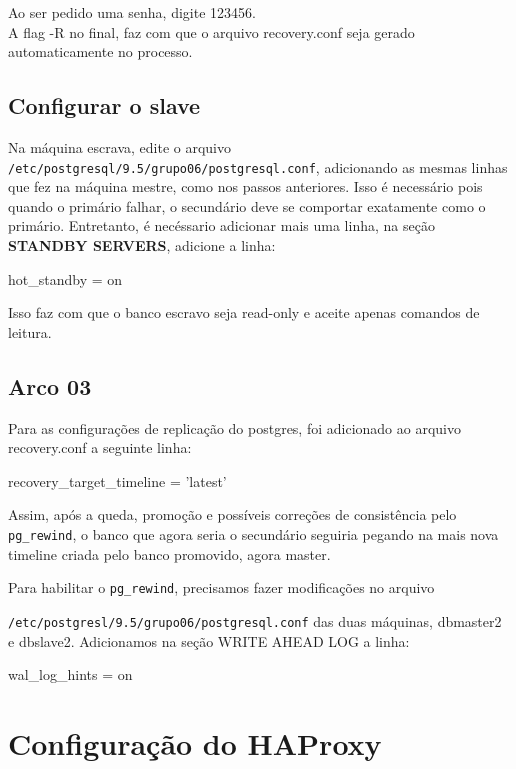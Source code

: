 \documentclass[a4paper,10pt]{article}
\begin{document}
        Ao ser pedido uma senha, digite 123456.\\
        A flag -R no final, faz com que o arquivo recovery.conf seja gerado automaticamente no processo.

    \subsection{Configurar o slave}
        Na máquina escrava, edite o arquivo \verb|/etc/postgresql/9.5/grupo06/postgresql.conf|, adicionando as mesmas linhas que fez na máquina mestre, como nos passos anteriores. Isso é necessário pois quando o primário falhar, o secundário deve se comportar exatamente como o primário. Entretanto, é necéssario adicionar mais uma linha, na seção \textbf{STANDBY SERVERS}, adicione a linha:
        \begin{spverbatim}
        hot_standby = on
        \end{spverbatim}

        Isso faz com que o banco escravo seja read-only e aceite apenas comandos de leitura.
        
    \subsection{Arco 03}
    
        Para as configurações de replicação do postgres, foi adicionado ao arquivo recovery.conf a seguinte linha:
        \begin{spverbatim}
        recovery_target_timeline = 'latest'
        \end{spverbatim}
    
        Assim, após a queda, promoção e possíveis correções de consistência pelo \verb|pg_rewind|, o banco que agora seria o secundário seguiria pegando na mais nova timeline criada pelo banco promovido, agora master.
    
    
    Para habilitar o \verb|pg_rewind|, precisamos fazer modificações no arquivo
    
    \verb|/etc/postgresl/9.5/grupo06/postgresql.conf| das duas máquinas, dbmaster2 e dbslave2. Adicionamos na seção WRITE AHEAD LOG a linha:
        
        \begin{spverbatim}
        wal_log_hints = on
        \end{spverbatim}

\section{Configuração do HAProxy}
\end{document}
